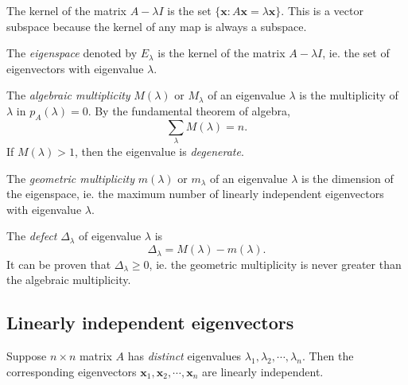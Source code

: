 \documentclass[a4paper]{article}
\begin{document}
The kernel of the matrix $A - \lambda I$ is the set $\{\mathbf{x}: A\mathbf{x} = \lambda\mathbf{x}\}$. This is a vector subspace because the kernel of any map is always a subspace.

\begin{defi}[Eigenspace]
  The \emph{eigenspace} denoted by $E_\lambda$ is the kernel of the matrix $A - \lambda I$, ie. the set of eigenvectors with eigenvalue $\lambda$.
\end{defi}

\begin{defi}
  The \emph{algebraic multiplicity} $M(\lambda)$ or $M_\lambda$ of an eigenvalue $\lambda$ is the multiplicity of $\lambda$ in $p_A(\lambda) = 0$. By the fundamental theorem of algebra,
  \[
    \sum_\lambda M(\lambda) = n.
  \]
  If $M(\lambda) > 1$, then the eigenvalue is \emph{degenerate}.
\end{defi}

\begin{defi}
  The \emph{geometric multiplicity} $m(\lambda)$ or $m_\lambda$ of an eigenvalue $\lambda$ is the dimension of the eigenspace, ie. the maximum number of linearly independent eigenvectors with eigenvalue $\lambda$.
\end{defi}

\begin{defi}
  The \emph{defect} $\Delta_\lambda$ of eigenvalue $\lambda$ is
  \[
    \Delta_\lambda = M(\lambda) - m(\lambda).
  \]
  It can be proven that $\Delta_\lambda \geq 0$, ie. the geometric multiplicity is never greater than the algebraic multiplicity.
\end{defi}

\subsection{Linearly independent eigenvectors}
\begin{thm}
  Suppose $n\times n$ matrix $A$ has \emph{distinct} eigenvalues $\lambda_1, \lambda_2, \cdots, \lambda_n$. Then the corresponding eigenvectors $\mathbf{x}_1, \mathbf{x}_2, \cdots, \mathbf{x}_n$ are linearly independent.
\end{thm}
\end{document}
